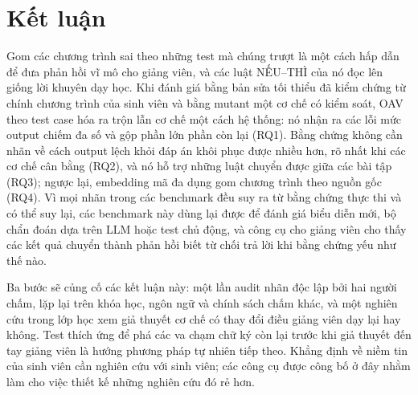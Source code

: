 \section{Kết luận}\label{sec:conclusion}

Gom các chương trình sai theo những test mà chúng trượt là một cách hấp dẫn để đưa phản hồi vĩ mô cho giảng viên, và các luật NẾU--THÌ của nó đọc lên giống lời khuyên dạy học. Khi đánh giá bằng bản sửa tối thiểu đã kiểm chứng từ chính chương trình của sinh viên và bằng mutant một cơ chế có kiểm soát, OAV theo test case hóa ra trộn lẫn cơ chế một cách hệ thống: nó nhận ra các lỗi mức output chiếm đa số và gộp phần lớn phần còn lại (RQ1). Bằng chứng không cần nhãn về cách output lệch khỏi đáp án khôi phục được nhiều hơn, rõ nhất khi các cơ chế cân bằng (RQ2), và nó hỗ trợ những luật chuyển được giữa các bài tập (RQ3); ngược lại, embedding mã đa dụng gom chương trình theo nguồn gốc (RQ4). Vì mọi nhãn trong các benchmark đều suy ra từ bằng chứng thực thi và có thể suy lại, các benchmark này dùng lại được để đánh giá biểu diễn mới, bộ chẩn đoán dựa trên LLM hoặc test chủ động, và công cụ cho giảng viên cho thấy các kết quả chuyển thành phản hồi biết từ chối trả lời khi bằng chứng yếu như thế nào.

Ba bước sẽ củng cố các kết luận này: một lần audit nhãn độc lập bởi hai người chấm, lặp lại trên khóa học, ngôn ngữ và chính sách chấm khác, và một nghiên cứu trong lớp học xem giả thuyết cơ chế có thay đổi điều giảng viên dạy lại hay không. Test thích ứng để phá các va chạm chữ ký còn lại trước khi giả thuyết đến tay giảng viên là hướng phương pháp tự nhiên tiếp theo. Khẳng định về niềm tin của sinh viên cần nghiên cứu với sinh viên; các công cụ được công bố ở đây nhằm làm cho việc thiết kế những nghiên cứu đó rẻ hơn.
